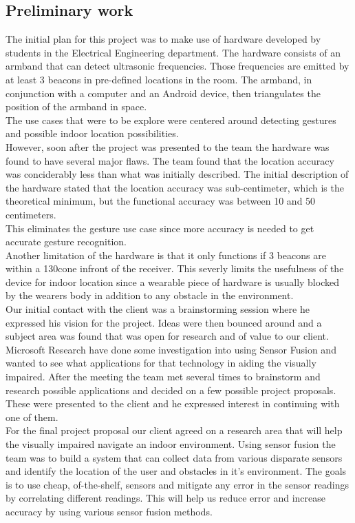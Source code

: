 \documentclass[prodmode,acmtecs]{acmsmall} %
\begin{document}
\subsection{Preliminary work}
The initial plan for this project was to make use of hardware developed by students in the Electrical Engineering department. The hardware consists of an armband that can detect ultrasonic frequencies. Those frequencies are emitted by at least 3 beacons in pre-defined locations in the room. The armband, in conjunction with a computer and an Android device, then triangulates the position of the armband in space.\\
The use cases that were to be explore were centered around detecting gestures and possible indoor location possibilities.\\
However, soon after the project was presented to the team the hardware was found to have several major flaws. The team found that the location accuracy was conciderably less than what was initially described. The initial description of the hardware stated that the location accuracy was sub-centimeter, which is the theoretical minimum, but the functional accuracy was between 10 and 50 centimeters.\\
This eliminates the gesture use case since more accuracy is needed to get accurate gesture recognition.\\
Another limitation of the hardware is that it only functions if 3 beacons are within a 130\circ cone infront of the receiver. This severly limits the usefulness of the device for indoor location since a wearable piece of hardware is usually blocked by the wearers body in addition to any obstacle in the environment.\\
Our initial contact with the client was a brainstorming session where he expressed his vision for the project. Ideas were then bounced around and a subject area was found that was open for research and of value to our client.\\
Microsoft Research have done some investigation into using Sensor Fusion
and wanted to see what applications for that technology in aiding the visually impaired.
After the meeting the team met several times to brainstorm and research possible applications and decided on a few possible project proposals.
These were presented to the client and he expressed interest in continuing with one of them.\\
For the final project proposal our client agreed on a research area that will help the visually impaired navigate an indoor environment.
Using sensor fusion the team was to build a system that can collect data from various disparate sensors and identify the location of the user and obstacles in it's environment.
The goals is to use cheap, of-the-shelf, sensors and mitigate any error in the sensor readings by correlating different readings. This will help us reduce error and increase accuracy by using various sensor fusion methods.
\end{document}
